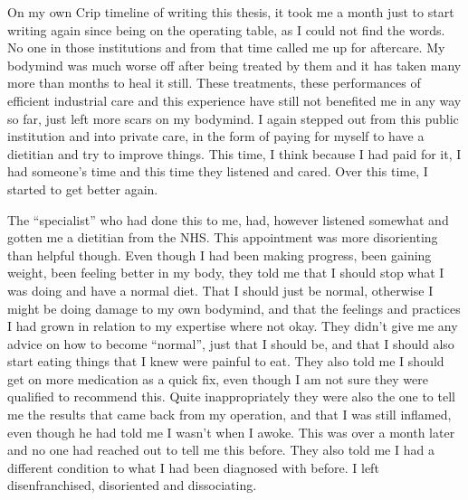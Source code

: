 On my own Crip timeline of writing this thesis, it took me a month just
to start writing again since being on the operating table, as I could
not find the words. No one in those institutions and from that time
called me up for aftercare. My bodymind was much worse off after being
treated by them and it has taken many more than months to heal it still.
These treatments, these performances of efficient industrial care and
this experience have still not benefited me in any way so far, just left
more scars on my bodymind. I again stepped out from this public
institution and into private care, in the form of paying for myself to
have a dietitian and try to improve things. This time, I think because I
had paid for it, I had someone's time and this time they listened and
cared. Over this time, I started to get better again.

The ``specialist'' who had done this to me, had, however listened
somewhat and gotten me a dietitian from the NHS. This appointment was
more disorienting than helpful though. Even though I had been making
progress, been gaining weight, been feeling better in my body, they told
me that I should stop what I was doing and have a normal diet. That I
should just be normal, otherwise I might be doing damage to my own
bodymind, and that the feelings and practices I had grown in relation to
my expertise where not okay. They didn't give me any advice on how to
become ``normal'', just that I should be, and that I should also start
eating things that I knew were painful to eat. They also told me I
should get on more medication as a quick fix, even though I am not sure
they were qualified to recommend this. Quite inappropriately they were
also the one to tell me the results that came back from my operation,
and that I was still inflamed, even though he had told me I wasn't when
I awoke. This was over a month later and no one had reached out to tell
me this before. They also told me I had a different condition to what I
had been diagnosed with before. I left disenfranchised, disoriented and
dissociating.

